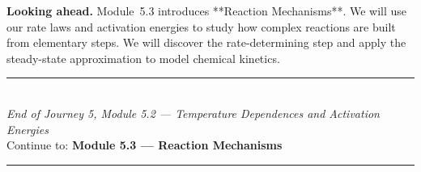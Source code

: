 \documentclass[12pt, a4paper]{book}
\begin{document}
\medskip
\noindent\textbf{Looking ahead.}
Module~5.3 introduces **Reaction Mechanisms**. We will use our rate laws and activation energies to study how complex reactions are built from elementary steps. We will discover the rate-determining step and apply the steady-state approximation to model chemical kinetics.

\vspace{1.4cm}
\begin{center}
{\color{JourneyColor}\rule{0.5\linewidth}{0.8pt}}\\[6pt]
{\small\color{JourneyColor}\textit{End of Journey 5, Module 5.2 --- Temperature Dependences and Activation Energies}}\\[4pt]
{\small\color{JourneyColor}Continue to: \textbf{Module 5.3 --- Reaction Mechanisms}}\\[6pt]
{\color{JourneyColor}\rule{0.5\linewidth}{0.8pt}}
\end{center}
\end{document}
